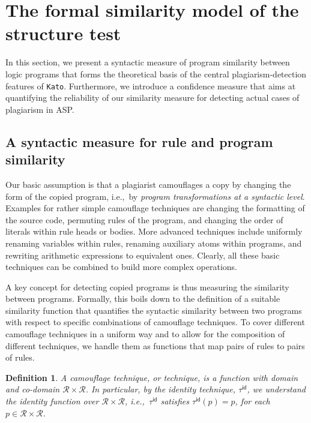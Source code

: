 \documentclass{tlp}
\newcommand{\iec}[0]{i.e.,\ }
\newcommand{\kato}[0]{\texttt{Kato}\xspace}
\newcommand{\rules}{\mathcal{R}}
\newcommand{\identity}{\tau^{\mathsf{id}}}
\newtheorem{definition}{Definition}
\begin{document}
\section{The formal similarity model of the structure test}\label{sec:theory}


In this section, we present a syntactic measure of program similarity between logic programs that forms the theoretical basis of the central plagiarism-detection features of \kato.
Furthermore, we introduce a  confidence measure that aims at quantifying the  reliability  of our similarity measure for detecting actual cases of plagiarism in ASP. 

\subsection{A syntactic measure for rule and program similarity}

Our basic assumption is that a plagiarist camouflages a copy by changing the form of the copied program, \iec by \emph{program transformations at a syntactic level}.  
Examples for rather simple camouflage techniques  are changing the formatting of the source code,
permuting rules of the program, and changing the order of literals within rule heads or bodies. 
More advanced techniques include uniformly renaming variables within rules, renaming auxiliary atoms
within programs, and rewriting   arithmetic expressions to equivalent ones.  
Clearly, all these basic techniques can be combined to build more complex operations.

A key concept for detecting copied programs is thus measuring the similarity between programs. 
Formally, this boils down to the definition of a suitable similarity function that quantifies the syntactic similarity between two programs  with respect to specific combinations of camouflage techniques. 
To cover different camouflage techniques in a uniform way and to allow for the composition of different techniques, we handle them as functions that map pairs of rules to pairs of rules.  

\begin{definition}\label{def:technique}
A \emph{camouflage technique}, or \emph{technique}, is a function
with domain and co-domain $\rules \times \rules$. 
In particular, by the \emph{identity technique}, $\identity$, we understand the identity function over $\rules \times \rules$, \iec $\identity$ satisfies $\identity(p)=p$, for each $p \in \rules \times \rules$.
\end{definition} 
\end{document}
